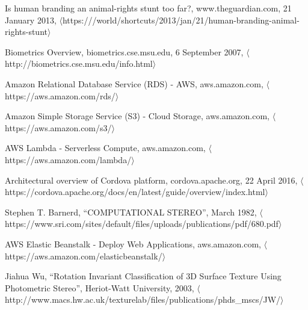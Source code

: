 \begin{thebibliography}{1}

  Is human branding an animal-rights stunt too far?,
  www.theguardian.com,
  21 January 2013,
  $\langle$https:///world/shortcuts/2013/jan/21/human-branding-animal-rights-stunt$\rangle$

  Biometrics Overview,
  biometrics.cse.msu.edu,
  6 September 2007,
  $\langle$http://biometrics.cse.msu.edu/info.html$\rangle$

  Amazon Relational Database Service (RDS) - AWS,
  aws.amazon.com,
  $\langle$https://aws.amazon.com/rds/$\rangle$

  Amazon Simple Storage Service (S3) - Cloud Storage,
  aws.amazon.com,
  $\langle$https://aws.amazon.com/s3/$\rangle$

  AWS Lambda - Serverless Compute,
  aws.amazon.com,
  $\langle$https://aws.amazon.com/lambda/$\rangle$
  
  Architectural overview of Cordova platform,
  cordova.apache.org,
  22 April 2016,
  $\langle$https://cordova.apache.org/docs/en/latest/guide/overview/index.html$\rangle$

  Stephen T. Barnerd,
  ``COMPUTATIONAL STEREO'',
  March 1982,
  $\langle$https://www.sri.com/sites/default/files/uploads/publications/pdf/680.pdf$\rangle$

  AWS Elastic Beanstalk - Deploy Web Applications,
  aws.amazon.com,
  $\langle$https://aws.amazon.com/elasticbeanstalk/$\rangle$

  Jiahua Wu,
  ``Rotation Invariant Classification of 3D Surface Texture Using Photometric Stereo'',
  Heriot-Watt University,
  2003,
  $\langle$http://www.macs.hw.ac.uk/texturelab/files/publications/phds\_mscs/JW/$\rangle$

\end{thebibliography}
